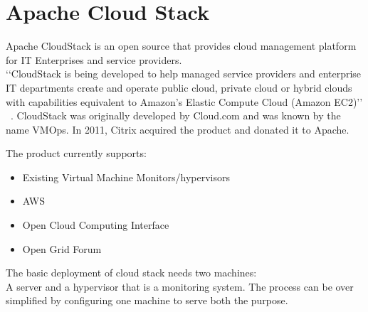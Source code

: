 \section{Apache Cloud Stack}

Apache CloudStack is an open source that provides cloud management platform for IT
Enterprises and service providers. \\
‘‘CloudStack is being developed to help managed service providers and enterprise IT 
departments create and operate public cloud, private cloud or hybrid clouds
with capabilities equivalent to Amazon's Elastic Compute Cloud (Amazon EC2)’’  
~\cite{ hid-sp18-417-techtarget-cloudStack}. 
CloudStack was originally developed by Cloud.com and was known by the name VMOps. 
In 2011, Citrix acquired the product and donated it to Apache. 

The product currently supports:
\begin{itemize}
\item        Existing Virtual Machine Monitors/hypervisors
\item        AWS
\item        Open Cloud Computing Interface
\item        Open Grid Forum
\end{itemize}
 The basic deployment of cloud stack needs two machines: \\
 A server and a hypervisor that is a monitoring system. 
 The process can be over simplified by configuring one machine 
 to serve both the purpose.
